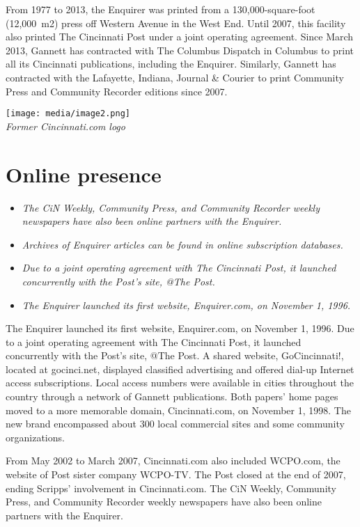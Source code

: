 From 1977 to 2013, the Enquirer was printed from a 130,000-square-foot
(12,000~m2) press off Western Avenue in the West End. Until 2007, this
facility also printed The Cincinnati Post under a joint operating
agreement. Since March 2013, Gannett has contracted with The Columbus
Dispatch in Columbus to print all its Cincinnati publications, including
the Enquirer. Similarly, Gannett has contracted with the Lafayette,
Indiana, Journal \& Courier to print Community Press and Community
Recorder editions since 2007.

\texttt{[image: media/image2.png]}\\
\emph{Former Cincinnati.com logo}

\section{Online presence}\label{online-presence}

\begin{itemize}
\item
  \emph{The CiN Weekly, Community Press, and Community Recorder weekly
  newspapers have also been online partners with the Enquirer.}
\item
  \emph{Archives of Enquirer articles can be found in online
  subscription databases.}
\item
  \emph{Due to a joint operating agreement with The Cincinnati Post, it
  launched concurrently with the Post's site, @The Post.}
\item
  \emph{The Enquirer launched its first website, Enquirer.com, on
  November 1, 1996.}
\end{itemize}

The Enquirer launched its first website, Enquirer.com, on November 1,
1996. Due to a joint operating agreement with The Cincinnati Post, it
launched concurrently with the Post's site, @The Post. A shared website,
GoCincinnati!, located at gocinci.net, displayed classified advertising
and offered dial-up Internet access subscriptions. Local access numbers
were available in cities throughout the country through a network of
Gannett publications. Both papers' home pages moved to a more memorable
domain, Cincinnati.com, on November 1, 1998. The new brand encompassed
about 300 local commercial sites and some community organizations.

From May 2002 to March 2007, Cincinnati.com also included WCPO.com, the
website of Post sister company WCPO-TV. The Post closed at the end of
2007, ending Scripps' involvement in Cincinnati.com. The CiN Weekly,
Community Press, and Community Recorder weekly newspapers have also been
online partners with the Enquirer.

